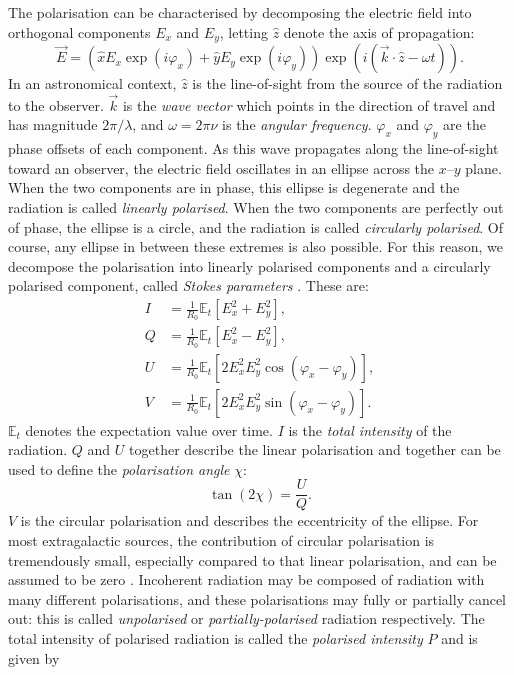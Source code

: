 \documentclass[11pt, a4paper]{book}
\newcommand{\defn}[1]{\emph{#1}}
\begin{document}
        The polarisation can be characterised by decomposing the electric field into orthogonal components $E_x$ and $E_y$, letting $\hat z$ denote the axis of propagation:
        \begin{equation}
            \vec E = (\hat x E_x \exp(i \varphi_x) + \hat y E_y \exp(i \varphi_y)) \exp(i (\vec k \cdot \hat z - \omega t)).
        \end{equation}
        In an astronomical context, $\hat z$ is the line-of-sight from the source of the radiation to the observer. $\vec k$ is the \defn{wave vector} which points in the direction of travel and has magnitude $2\pi/\lambda$, and $\omega = 2\pi\nu$ is the \defn{angular frequency}. $\varphi_x$ and $\varphi_y$ are the phase offsets of each component. As this wave propagates along the line-of-sight toward an observer, the electric field oscillates in an ellipse across the $x$--$y$ plane. When the two components are in phase, this ellipse is degenerate and the radiation is called \defn{linearly polarised}. When the two components are perfectly out of phase, the ellipse is a circle, and the radiation is called \defn{circularly polarised}. Of course, any ellipse in between these extremes is also possible. For this reason, we decompose the polarisation into linearly polarised components and a circularly polarised component, called \defn{Stokes parameters} \citep{stokes_composition_1851,condon_essential_2016}. These are:
        \begin{align}
            \label{eq:stokes-i}
            I &= \frac{1}{R_0} \mathbb E_t[E_x^2 + E_y^2],\\
            \label{eq:stokes-q}
            Q &= \frac{1}{R_0} \mathbb E_t[E_x^2 - E_y^2],\\
            \label{eq:stokes-u}
            U &= \frac{1}{R_0} \mathbb E_t[2 E_x^2 E_y^2 \cos (\varphi_x - \varphi_y)],\\
            \label{eq:stokes-v}
            V &= \frac{1}{R_0} \mathbb E_t[2 E_x^2 E_y^2 \sin (\varphi_x - \varphi_y)].
        \end{align}
        $\mathbb E_t$ denotes the expectation value over time. $I$ is the \defn{total intensity} of the radiation. $Q$ and $U$ together describe the linear polarisation and together can be used to define the \defn{polarisation angle} $\chi$:
        \begin{equation}
            \label{eq:polarisation-angle}
            \tan (2 \chi) = \frac{U}{Q}.
        \end{equation}
        $V$ is the circular polarisation and describes the eccentricity of the ellipse. For most extragalactic sources, the contribution of circular polarisation is tremendously small, especially compared to that linear polarisation, and can be assumed to be zero \citep{rayner_radio_2000,saikia_polarization_1988}. Incoherent radiation may be composed of radiation with many different polarisations, and these polarisations may fully or partially cancel out: this is called \defn{unpolarised} or \defn{partially-polarised} radiation respectively. The total intensity of polarised radiation is called the \defn{polarised intensity} $P$ and is given by
\end{document}
